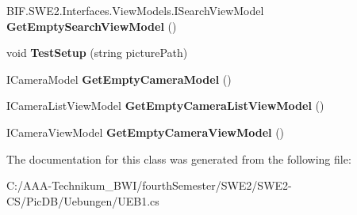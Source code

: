 \begin{DoxyCompactItemize}
B\+I\+F.\+S\+W\+E2.\+Interfaces.\+View\+Models.\+I\+Search\+View\+Model {\bfseries Get\+Empty\+Search\+View\+Model} ()
\item 
\mbox{\label{class_pic_d_b_1_1_uebungen_1_1_u_e_b1_a2e8cba6371dc4355126680d5ae99e300}} 
void {\bfseries Test\+Setup} (string picture\+Path)
\item 
\mbox{\label{class_pic_d_b_1_1_uebungen_1_1_u_e_b1_a9e2beee761b73a45d17babb2c884a4b6}} 
I\+Camera\+Model {\bfseries Get\+Empty\+Camera\+Model} ()
\item 
\mbox{\label{class_pic_d_b_1_1_uebungen_1_1_u_e_b1_aea7762ec1b242e86db3b16637c4be8b1}} 
I\+Camera\+List\+View\+Model {\bfseries Get\+Empty\+Camera\+List\+View\+Model} ()
\item 
\mbox{\label{class_pic_d_b_1_1_uebungen_1_1_u_e_b1_a7882d9be85be13222065022a89e8a394}} 
I\+Camera\+View\+Model {\bfseries Get\+Empty\+Camera\+View\+Model} ()
\end{DoxyCompactItemize}


The documentation for this class was generated from the following file\+:\begin{DoxyCompactItemize}
\item 
C\+:/\+A\+A\+A-\/\+Technikum\+\_\+\+B\+W\+I/fourth\+Semester/\+S\+W\+E2/\+S\+W\+E2-\/\+C\+S/\+Pic\+D\+B/\+Uebungen/U\+E\+B1.\+cs\end{DoxyCompactItemize}
